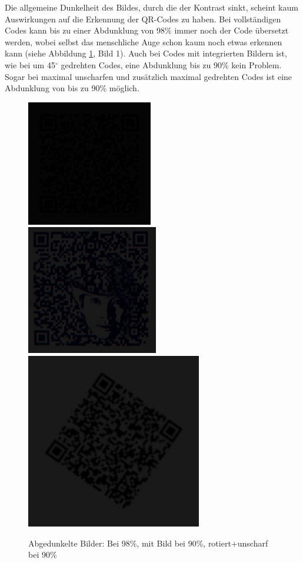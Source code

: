 Die allgemeine Dunkelheit des Bildes, durch die der Kontrast sinkt, scheint kaum Auswirkungen auf die Erkennung der QR-Codes zu haben. Bei vollständigen Codes kann bis zu einer Abdunklung von 98\% immer noch der Code übersetzt werden, wobei selbst das menschliche Auge schon kaum noch etwas erkennen kann (siehe Abbildung \ref*{fig:qrdark}, Bild 1). Auch bei Codes mit integrierten Bildern ist, wie bei um 45$ ^\circ $ gedrehten Codes, eine Abdunklung bis zu 90\% kein Problem. Sogar bei maximal unscharfen und zusätzlich maximal gedrehten Codes ist eine Abdunklung von bis zu 90\% möglich.
\begin{figure}[H]
  \centering
  \includegraphics[height=0.3\textwidth]{img/QR/dark_03_98.jpg}
  \includegraphics[height=0.3\textwidth]{img/QR/dark_04_90.jpg}
  \includegraphics[height=0.3\textwidth]{img/QR/blurrydarkrotate_03_3_90_35.jpg}
  \caption{Abgedunkelte Bilder: Bei 98\%, mit Bild bei 90\%, rotiert+unscharf bei 90\%}
  \label{fig:qrdark}
\end{figure}

